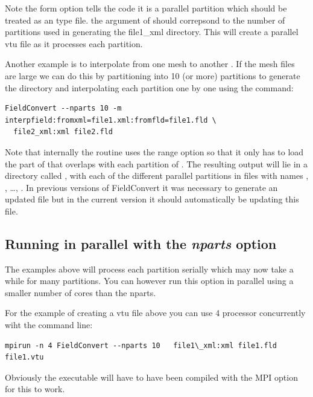 Note the form  option tells the code it is a
parallel partition which should be treated as an  type
file. the argument of  should correpsond to the number
of partitions used in generating the file1\_xml directory. This will
create a parallel vtu file as it processes each partition.


Another example is to interpolate  from one mesh
 to another . If the mesh files are
large we can do this by partitioning  into 10 (or
more) partitions to generate the  directory and
interpolating each partition one by one using the command:
\begin{lstlisting}[style=BashInputStyle]
  FieldConvert --nparts 10 -m interpfield:fromxml=file1.xml:fromfld=file1.fld \
  file2_xml:xml file2.fld
\end{lstlisting}
Note that internally the routine uses the range option so that it only
has to load the part of \inltt{file1.xml} that overlaps with each
partition of \inltt{file2.xml}.  The resulting output will lie in a
directory called \inltt{file2.fld}, with each of the different
parallel partitions in files with names ,
, \dots, . In previous
versions of FieldConvert it was necessary to generate an updated
\inltt{Info.xml} file but in the current version it should
automatically be updating this file.

\subsection{Running in parallel with the \textit{ nparts} option}

The examples above will process each partition serially which may now
take a while for many partitions. You can however run this option in
parallel using a smaller number of cores than the nparts.

For the example of creating a vtu file above you can use 4 processor
concurrently wiht the command line:
\begin{lstlisting}[style=BashInputStyle]
mpirun -n 4 FieldConvert --nparts 10   file1\_xml:xml file1.fld file1.vtu
\end{lstlisting}

Obviously the executable will have to have been compiled with the MPI
option for this to work.



